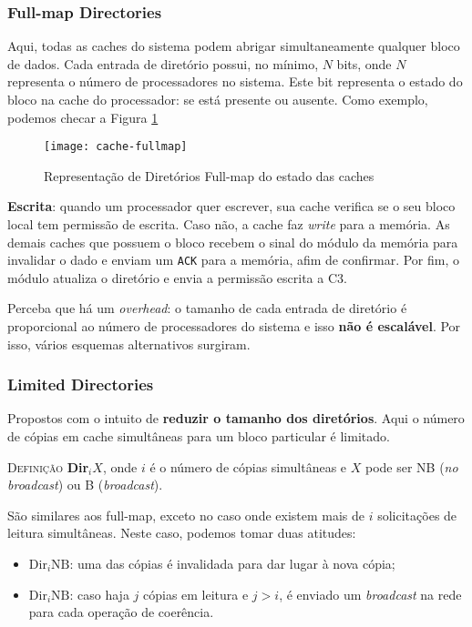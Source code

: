\subsubsection{Full-map Directories}
Aqui, todas as caches do sistema podem abrigar simultaneamente qualquer bloco de dados. Cada entrada de diretório possui, no mínimo, $N$ bits, onde $N$ representa o número de processadores no sistema. Este bit representa o estado do bloco na cache do processador: se está presente ou ausente. Como exemplo, podemos checar a Figura \ref{fig:cache-fullmap}

\begin{figure}
  \centering
  \texttt{[image: cache-fullmap]}
  \caption{Representação de Diretórios Full-map do estado das caches}
  \label{fig:cache-fullmap}
\end{figure}

\textbf{Escrita}: quando um processador quer escrever, sua cache verifica se o seu bloco local tem permissão de escrita. Caso não, a cache faz \textit{write} para a memória. As demais caches que possuem o bloco recebem o sinal do módulo da memória para invalidar o dado e enviam um \texttt{ACK} para a memória, afim de confirmar. Por fim, o módulo atualiza o diretório e envia a permissão escrita a C3.

Perceba que há um \textit{overhead}: o tamanho de cada entrada de diretório é proporcional ao número de processadores do sistema e isso \textbf{não é escalável}. Por isso, vários esquemas alternativos surgiram.




\subsubsection{Limited Directories}
Propostos com o intuito de \textbf{reduzir o tamanho dos diretórios}. Aqui o número de cópias em cache simultâneas para um bloco particular é limitado.

\textsc{Definição} \textbf{Dir$_{i}X$}, onde $i$ é o número de cópias simultâneas e $X$ pode ser NB (\textit{no broadcast}) ou B (\textit{broadcast}).

São similares aos full-map, exceto no caso onde existem mais de $i$ solicitações de leitura simultâneas. Neste caso, podemos tomar duas atitudes:
\begin{itemize}
  \item $\text{Dir}_i\text{NB}$: uma das cópias é invalidada para dar lugar à nova cópia;

  \item $\text{Dir}_i\text{NB}$: caso haja $j$ cópias em leitura e $j > i$, é enviado um \textit{broadcast} na rede para cada operação de coerência.
\end{itemize}


